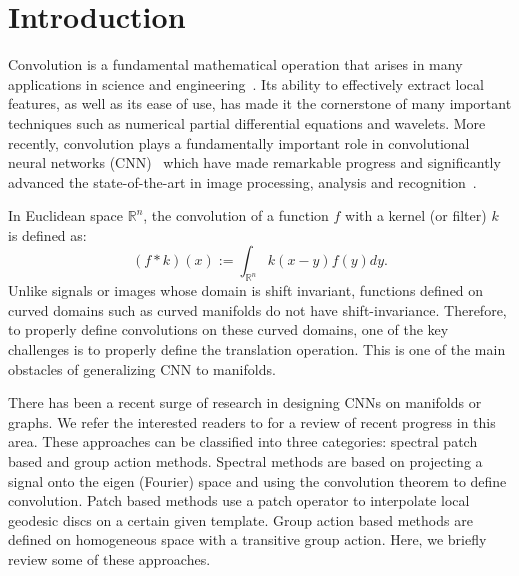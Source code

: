 \documentclass[10pt,twocolumn,letterpaper]{article}
\def\RR{\mathbb{R}}
\begin{document}
\section{Introduction}

Convolution is a fundamental mathematical operation that arises in many applications in science and engineering~\cite{Daubechies:1992ten,mallat2008wavelet}. Its ability to effectively extract local features, as well as its ease of use, has made it the cornerstone of many important techniques such as numerical partial differential equations and wavelets. More recently, convolution plays a fundamentally important role in convolutional neural networks (CNN)~\cite{lecun1990handwritten} which have made remarkable progress and significantly advanced the state-of-the-art in image processing, analysis and recognition~\cite{lecun1990handwritten,bengio2015deep,krizhevsky2012imagenet,ciresan2012deep,hinton2012deep,sermanet2013overfeat,leung2014deep,sutskever2014sequence}.

In Euclidean space $\RR^n$, the convolution of a function $f$ with a kernel (or filter) $k$ is defined as:
\begin{equation}
(f * k)(x) := \int_{\RR^n} k(x-y)f(y) dy.
\end{equation}
Unlike signals or images whose domain is shift invariant, functions defined on curved domains such as curved manifolds do not have shift-invariance. Therefore, to properly define convolutions on these curved domains, one of the key challenges is to properly define the translation operation. This is one of the main obstacles of generalizing CNN to manifolds.


There has been a recent surge of research in designing CNNs on manifolds or graphs. We refer the interested readers to \cite{bronstein2017geometric} for a review of recent progress in this area. These approaches can be classified into three categories: spectral patch based and group action methods. Spectral methods are based on projecting a signal onto the eigen (Fourier) space and using the convolution theorem to define convolution. Patch based methods use a patch operator to interpolate local geodesic discs on a certain given template. Group action based methods are defined on homogeneous space with a transitive group action.   Here, we briefly review some of these approaches.
\end{document}
